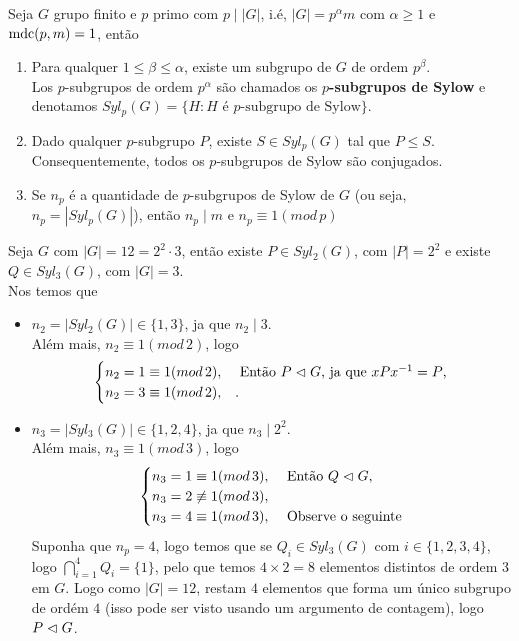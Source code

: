 \begin{theorem}
  Seja $G$ grupo finito e $p$ primo com $p\mid |G|$, i.é, $|G|=p^{\alpha}m$ com $\alpha\geq 1$ e $\operatorname{mdc}(p,m)=1$, então
  \begin{enumerate}
    \item Para qualquer $1\leq \beta\leq \alpha$, existe um subgrupo de $G$ de ordem $p^{\beta}$.\\
      Los $p$-subgrupos de ordem $p^{\alpha}$ são chamados os \textbf{$p$-subgrupos de Sylow} e denotamos $Syl_{p}(G)=\{H:H\text{ é $p$-subgrupo de Sylow}\}$.
    \item Dado qualquer $p$-subgrupo $P$, existe $S\in Syl_{p}(G)$ tal que $P\leq S$. Consequentemente, todos os $p$-subgrupos de Sylow são conjugados.
    \item Se $n_p$ é a quantidade de $p$-subgrupos de Sylow de $G$ (ou seja, $n_p=|Syl_{p}(G)|$), então $n_p\mid m$ e $n_p\equiv 1(mod\,p)$ 
  \end{enumerate}
\end{theorem}
\begin{example}
  Seja $G$ com $|G|=12=2^{2}\cdot 3$, então existe $P\in Syl_{2}(G)$, com $|P|=2^{2}$ e existe $Q\in Syl_{3}(G)$, com $|G|=3$.\\
  Nos temos que
  \begin{itemize}
    \item $n_2=|Syl_{2}(G)|\in \{1,3\}$, ja que $n_2\mid 3$.\\
      Além mais, $n_2\equiv 1(mod\, 2)$, logo
      \begin{align*}
        \begin{cases}
          n_2=1\equiv 1(mod\,2), &\text{ Então $P\vartriangleleft G$, ja que $xPx^{-1}=P$}\text{,} \\
          n_2=3\equiv 1(mod\,2), &.
        \end{cases}
      \end{align*}
    \item $n_3=|Syl_{3}(G)|\in \{1,2,4\}$, ja que $n_3\mid 2^{2}$.\\
      Além mais, $n_3\equiv 1(mod\, 3)$, logo
      \begin{align*}
        \begin{cases}
          n_3=1\equiv 1(mod\,3), &\text{ Então $Q\vartriangleleft G$}\text{,} \\
          n_3=2\not\equiv 1(mod\,3), &\\
          n_3=4\equiv 1(mod\,3), &\text{ Observe o seguinte}
        \end{cases}
      \end{align*}
      Suponha que $n_p=4$, logo temos que se $Q_i\in Syl_{3}(G)$ com $i\in\{1,2,3,4\}$, logo $\bigcap_{i=1}^{4}Q_i=\{1\}$, pelo que temos $4\times 2=8$ elementos distintos de ordem $3$ em $G$. Logo como $|G|=12$, restam $4$ elementos que forma um único subgrupo de ordém $4$ (isso pode ser visto usando um argumento de contagem), logo $P\vartriangleleft G$. 
  \end{itemize}
\end{example}

